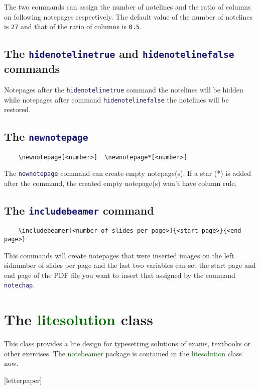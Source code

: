 \documentclass[11pt,svgnames]{article}
\def\pkg#1{\textcolor{DarkGreen}{\textsf{#1}}}
\def\cmd#1{\textcolor{MidnightBlue}{\texttt{\string#1}}}
\begin{document}
The two commands can assign the number of notelines and the ratio of columns on following notepages respectively. The default value of the number of notelines is \verb|27| and that of the ratio of columns is \verb|0.5|.

\subsection{The \cmd{hidenotelinetrue} and \cmd{hidenotelinefalse} commands}

Notepages after the \cmd{hidenotelinetrue} command the notelines will be hidden while notepages after command \cmd{hidenotelinefalse} the notelines will be restored.

\subsection{The \cmd{newnotepage}}

\begin{verbatim}
    \newnotepage[<number>]  \newnotepage*[<number>]
\end{verbatim}

The \cmd{newnotepage} command can create empty notepage(s). If a star (*) is added after the command, the created empty notepage(s) won't have column rule.

\subsection{The \cmd{includebeamer} command}

\begin{verbatim}
    \includebeamer[<number of slides per page>]{<start page>}{<end page>}
\end{verbatim}

This commands will create notepages that were inserted images on the left sidnumber of slides per page and the last two variables can set the start page and end page of the PDF file you want to insert that assigned by the command \cmd{notechap}.

\appendix
\section{The \pkg{litesolution} class}

This class provides a lite design for typesetting solutions of exams, textbooks or other exercises. The \pkg{notebeamer} package is contained in the \pkg{litesolution} class now.

\clearpage
{}[letterpaper]

\pagecolor{yellow!2}

\hidenotelinefalse      {}
\hidenotelinetrue       {}

\hidenotelinefalse      {}

    \newnotepage
\end{document}
